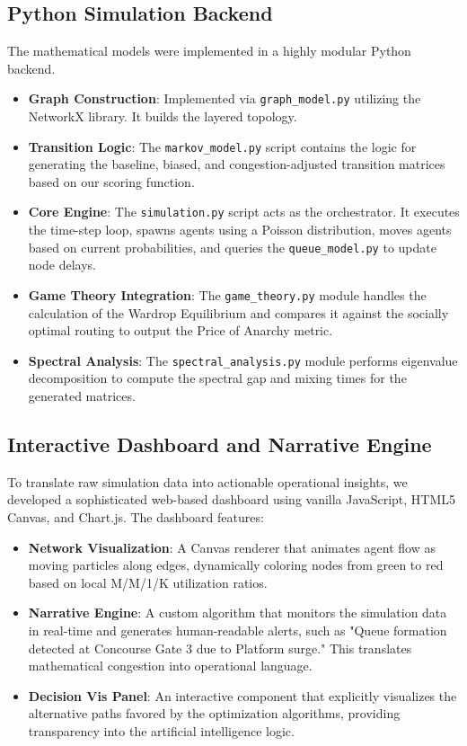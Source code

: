 \documentclass[conference]{IEEEtran}
\begin{document}
\subsection{Python Simulation Backend}
The mathematical models were implemented in a highly modular Python backend.
\begin{itemize}
    \item \textbf{Graph Construction}: Implemented via \texttt{graph\_model.py} utilizing the NetworkX library. It builds the layered topology.
    \item \textbf{Transition Logic}: The \texttt{markov\_model.py} script contains the logic for generating the baseline, biased, and congestion-adjusted transition matrices based on our scoring function.
    \item \textbf{Core Engine}: The \texttt{simulation.py} script acts as the orchestrator. It executes the time-step loop, spawns agents using a Poisson distribution, moves agents based on current probabilities, and queries the \texttt{queue\_model.py} to update node delays.
    \item \textbf{Game Theory Integration}: The \texttt{game\_theory.py} module handles the calculation of the Wardrop Equilibrium and compares it against the socially optimal routing to output the Price of Anarchy metric.
    \item \textbf{Spectral Analysis}: The \texttt{spectral\_analysis.py} module performs eigenvalue decomposition to compute the spectral gap and mixing times for the generated matrices.
\end{itemize}

\subsection{Interactive Dashboard and Narrative Engine}
To translate raw simulation data into actionable operational insights, we developed a sophisticated web-based dashboard using vanilla JavaScript, HTML5 Canvas, and Chart.js.
The dashboard features:
\begin{itemize}
    \item \textbf{Network Visualization}: A Canvas renderer that animates agent flow as moving particles along edges, dynamically coloring nodes from green to red based on local M/M/1/K utilization ratios.
    \item \textbf{Narrative Engine}: A custom algorithm that monitors the simulation data in real-time and generates human-readable alerts, such as "Queue formation detected at Concourse Gate 3 due to Platform surge." This translates mathematical congestion into operational language.
    \item \textbf{Decision Vis Panel}: An interactive component that explicitly visualizes the alternative paths favored by the optimization algorithms, providing transparency into the artificial intelligence logic.
\end{itemize}
\end{document}
